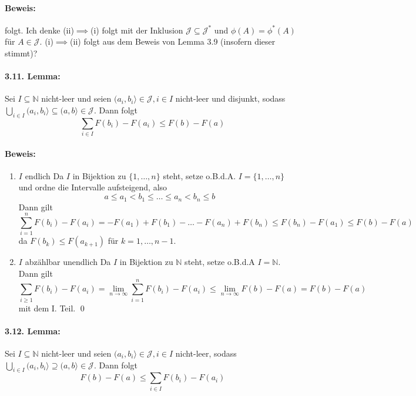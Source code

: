 \documentclass[12pt]{report}
\begin{document}
\paragraph{Beweis:} folgt. Ich denke (ii)$\implies$(i) folgt mit der Inklusion $\mathcal{J}\subseteq\mathcal{J}^*$ und $\phi(A)=\phi^*(A)$ f\"ur $A\in\mathcal{J}$. (i)$\implies$(ii) folgt aus dem Beweis von Lemma 3.9 (insofern dieser stimmt)?

\paragraph{3.11. Lemma:}Sei $I\subseteq\mathbb{N}$ nicht-leer und seien $(a_i,b_i\rangle\in\mathcal{J},i\in I$ nicht-leer und disjunkt, sodass $\bigcup_{i\in I}(a_i,b_i\rangle\subseteq(a,b\rangle\in\mathcal{J}$. Dann folgt 
$$\sum_{i\in I}F(b_i)-F(a_i)\leq F(b)-F(a)$$

\paragraph{Beweis:}
\begin{enumerate}[label=\Roman*.]
    \item $I$ endlich\newline
    Da $I$ in Bijektion zu $\{1,\hdots,n\}$ steht, setze o.B.d.A. $I=\{1,\hdots,n\}$ und ordne die Intervalle aufsteigend, also
    $$a\leq a_1<b_1\leq\hdots\leq a_n<b_n\leq b$$
    Dann gilt
    $$\sum_{i=1}^nF(b_i)-F(a_i)=-F(a_1)+F(b_1)-\hdots-F(a_n)+F(b_n)\leq F(b_n)-F(a_1)\leq F(b)-F(a)$$
    da $F(b_k)\leq F(a_{k+1})$ f\"ur $k=1,\hdots,n-1$. 
    \item $I$ abz\"ahlbar unendlich\newline
    Da $I$ in Bijektion zu $\mathbb{N}$ steht, setze o.B.d.A $I=\mathbb{N}$. Dann gilt
    $$\sum_{i\geq1}F(b_i)-F(a_i)=\lim_{n\to\infty}\sum_{i=1}^nF(b_i)-F(a_i)\leq\lim_{n\to\infty}F(b)-F(a)=F(b)-F(a)$$
    mit dem I. Teil. \qed
\end{enumerate}

\paragraph{3.12. Lemma:} Sei $I\subseteq\mathbb{N}$ nicht-leer und seien $(a_i,b_i\rangle\in\mathcal{J},i\in I$ nicht-leer, sodass $\bigcup_{i\in I}(a_i,b_i\rangle\supseteq(a,b\rangle\in\mathcal{J}$. Dann folgt
$$F(b)-F(a)\leq\sum_{i\in I}F(b_i)-F(a_i)$$
\end{document}
